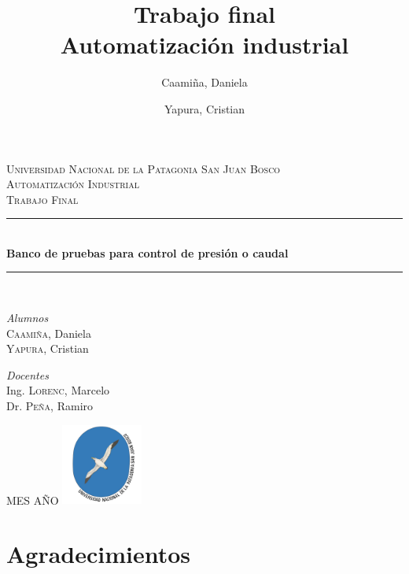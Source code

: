 \documentclass[12pt,a4paper]{article}
\date{}
\author{Caamiña, Daniela \and Yapura, Cristian}
\title{Trabajo final \\Automatización industrial}
\begin{document}
\begin{titlepage} %
	\newcommand{\HRule}{\rule{\linewidth}{0.5mm}}
	\center %
	\textsc{\LARGE Universidad Nacional de la Patagonia San Juan Bosco}\\[1.5cm]
	\textsc{\Large Automatización Industrial}\\[0.5cm]
	\textsc{\large Trabajo Final}\\[0.5cm]
	\HRule\\[0.4cm]
	\huge\bfseries{Banco de pruebas para control de presión o caudal}\\[0.2cm]
	\HRule\\[1.5cm]
	\begin{minipage}{0.4\textwidth}
		\begin{flushleft}
			\large
			\textit{Alumnos}\\
			\textsc{Caamiña,} Daniela \\
			\textsc{Yapura,} Cristian
		\end{flushleft}
	\end{minipage}
	\begin{minipage}{0.4\textwidth}
		\begin{flushright}
			\large
			\textit{Docentes}\\
			Ing. \textsc{Lorenc,} Marcelo \\
			Dr. \textsc{Peña,} Ramiro
		\end{flushright}
	\end{minipage}
	\vfill\vfill\vfill
	\large{MES AÑO}
	\vfill\vfill
	\includegraphics[width=0.2\textwidth]{unpsjb.png}\\[1cm]
	\vfill
\end{titlepage}

\newpage
	


\section*{Agradecimientos}
\vspace{6cm}
\end{document}

